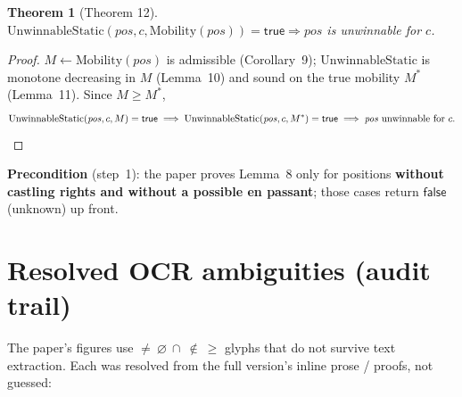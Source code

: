 \documentclass[11pt]{article}
\theoremstyle{plain}
\newtheorem{theorem}{Theorem}
\theoremstyle{definition}
\newcommand{\pos}{\mathit{pos}}
\newcommand{\true}{\ensuremath{\mathsf{true}}}
\newcommand{\false}{\ensuremath{\mathsf{false}}}
\newcommand{\Mobility}{\mathrm{Mobility}}
\newcommand{\UnwinnableStatic}{\mathrm{UnwinnableStatic}}
\begin{document}
\begin{theorem}[Theorem 12]
$\UnwinnableStatic(\pos, c, \Mobility(\pos)) = \true \Longrightarrow \pos$ is unwinnable for $c$.
\end{theorem}

\begin{proof}
$M \leftarrow \Mobility(\pos)$ is admissible (Corollary~9); $\UnwinnableStatic$ is monotone decreasing in $M$
(Lemma~10) and sound on the true mobility $M^*$ (Lemma~11). Since $M \ge M^*$,
\[
  \UnwinnableStatic(\pos,c,M) = \true \;\Longrightarrow\; \UnwinnableStatic(\pos,c,M^*) = \true \;\Longrightarrow\; \pos \text{ unwinnable for } c. \qedhere
\]
\end{proof}

\textbf{Precondition} (step~1): the paper proves Lemma~8 only for positions \textbf{without castling rights and
without a possible en passant}; those cases return \false{} (unknown) up front.

\section{Resolved OCR ambiguities (audit trail)}

The paper's figures use $\ne\ \varnothing\ \cap\ \notin\ \ge$ glyphs that do not survive text extraction. Each was
resolved from the full version's inline prose / proofs, not guessed:
\end{document}
